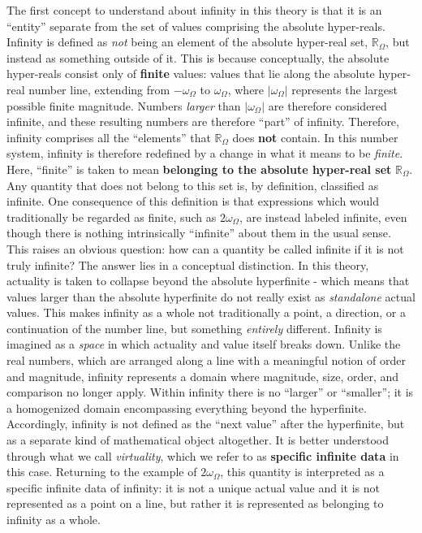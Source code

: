 \documentclass{article}
\begin{document}
The first concept to understand about infinity in this theory is that it is an ``entity'' separate from the set of values comprising the absolute hyper-reals. Infinity is defined as \textit{not} being an element of the absolute hyper-real set, $\mathbb{R}_\Omega$, but instead as something outside of it. This is because conceptually, the absolute hyper-reals consist only of \textbf{finite} values: values that lie along the absolute hyper-real number line, extending from $-\omega_\Omega$ to $\omega_\Omega$, where $|\omega_\Omega|$ represents the largest possible finite magnitude. Numbers \textit{larger} than $|\omega_\Omega|$ are therefore considered infinite, and these resulting numbers are therefore ``part'' of infinity. Therefore, infinity comprises all the ``elements'' that $\mathbb{R}_\Omega$ does \textbf{not} contain. In this number system, infinity is therefore redefined by a change in what it means to be \textit{finite}. Here, ``finite'' is taken to mean \textbf{belonging to the absolute hyper-real set} $\mathbb{R}_\Omega$. Any quantity that does not belong to this set is, by definition, classified as infinite. One consequence of this definition is that expressions which would traditionally be regarded as finite, such as $2\omega_\Omega$, are instead labeled infinite, even though there is nothing intrinsically ``infinite'' about them in the usual sense. This raises an obvious question: how can a quantity be called infinite if it is not truly infinite? The answer lies in a conceptual distinction. In this theory, actuality is taken to collapse beyond the absolute hyperfinite - which means that values larger than the absolute hyperfinite do not really exist as \textit{standalone} actual values. This makes infinity as a whole not traditionally a point, a direction, or a continuation of the number line, but something \textit{entirely} different. Infinity is imagined as a \textit{space} in which actuality and value itself breaks down. Unlike the real numbers, which are arranged along a line with a meaningful notion of order and magnitude, infinity represents a domain where magnitude, size, order, and comparison no longer apply. Within infinity there is no ``larger'' or ``smaller''; it is a homogenized domain encompassing everything beyond the hyperfinite. Accordingly, infinity is not defined as the ``next value'' after the hyperfinite, but as a separate kind of mathematical object altogether. It is better understood through what we call \textit{virtuality}, which we refer to as \textbf{specific infinite data} in this case. Returning to the example of $2\omega_\Omega$, this quantity is interpreted as a specific infinite data of infinity: it is not a unique actual value and it is not represented as a point on a line, but rather it is represented as belonging to infinity as a whole. \\
\end{document}
